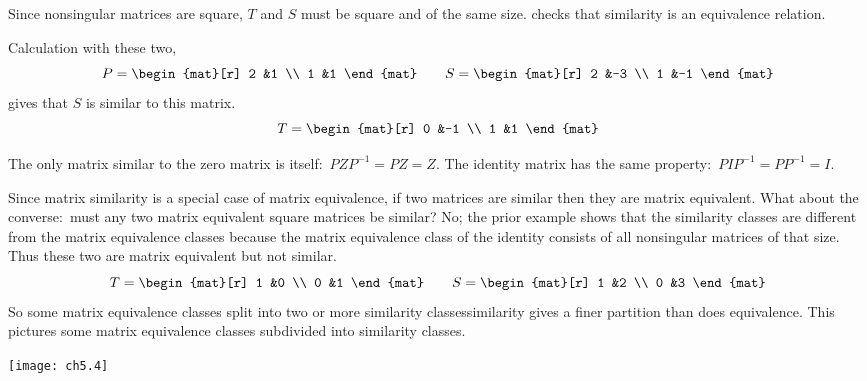 \noindent Since nonsingular matrices are square, 
$T$ and $S$ must
be square and of the same size.
 checks that
similarity is an equivalence relation.

\begin{example}
Calculation with these two,
\begin{equation*}
  P=
  \begin{mat}[r]
    2  &1  \\
    1  &1
  \end{mat}
  \qquad
  S=
  \begin{mat}[r]
    2  &-3  \\
    1  &-1
  \end{mat}
\end{equation*}
gives that $S$ is similar to this matrix.
\begin{equation*}
  T=
  \begin{mat}[r]
    0  &-1  \\
    1  &1
  \end{mat}
\end{equation*}
\end{example}

\begin{example}  \label{ex:OnlyZeroSimToZero}
The only matrix similar to the zero matrix is itself:~$PZP^{-1}=PZ=Z$.
The identity matrix has the same property:~$PIP^{-1}=PP^{-1}=I$.
\end{example}

Since matrix similarity is a special case of matrix equivalence, 
if two matrices are similar then they are matrix equivalent.
What about the converse:~must any two matrix equivalent square matrices be 
similar?
No;
the prior example shows that the similarity classes are different
from the matrix equivalence classes because the matrix equivalence class
of the identity consists of all nonsingular matrices of that size. 
Thus these two are
matrix equivalent but not similar.
\begin{equation*}
  T=
  \begin{mat}[r]
    1  &0  \\
    0  &1
  \end{mat}
  \qquad
  S=
  \begin{mat}[r]
    1  &2  \\
    0  &3
  \end{mat}
\end{equation*}
So some matrix equivalence classes
split into two or more similarity classes\Dash similarity gives a finer
partition than does equivalence.
This pictures some matrix equivalence classes subdivided into
similarity classes.
\begin{center}
  \texttt{[image: ch5.4]}
\end{center}

